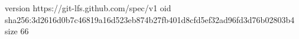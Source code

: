 version https://git-lfs.github.com/spec/v1
oid sha256:3d2616d0b7c46819a16d523eb874b27fb401d8cfd5ef32ad96fd3d76b02803b4
size 66
